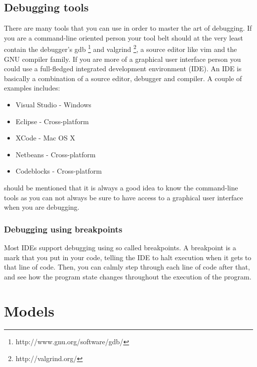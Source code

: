 \documentclass[11pt,a4paper,twoside]{article}
\begin{document}
\subsection{Debugging tools}

There are many tools that you can use in order to master the art of debugging.
If you are a command-line oriented person your tool belt should at the very
least contain the debugger's gdb \footnote{http://www.gnu.org/software/gdb/}
and valgrind \footnote{http://valgrind.org/}, a source editor like vim and the
GNU compiler family. If you are more of a graphical user interface person you
could use a full-fledged integrated development environment (IDE). An IDE is
basically a combination of a source editor, debugger and compiler. A couple of
examples includes:

\begin{itemize}
\item Visual Studio - Windows
\item Eclipse - Cross-platform
\item XCode - Mac OS X
\item Netbeans - Cross-platform
\item Codeblocks - Cross-platform
\end{itemize}


 should be mentioned that it is always a good idea to know the
command-line tools as you can not always be sure to have access to a graphical
user interface when you are debugging.  

\subsubsection{Debugging using breakpoints}

Most IDEs support debugging using so called breakpoints. A breakpoint is a mark
that you put in your code, telling the IDE to halt execution when it gets to
that line of code. Then, you can calmly step through each line of code after
that, and see how the program state changes throughout the execution of the
program.


\section{Models}
\end{document}
